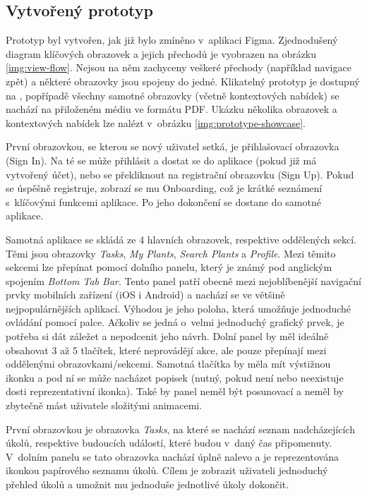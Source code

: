 \documentclass[thesis=M,czech]{FITthesis}[2019/12/23]
\begin{document}
\subsection{Vytvořený prototyp}
Prototyp byl vytvořen, jak již bylo zmíněno v~aplikaci Figma. Zjednodušený diagram klíčových obrazovek a jejich přechodů je vyobrazen na obrázku \ref{img:view-flow}. Nejsou na něm zachyceny veškeré přechody (například navigace zpět) a některé obrazovky jsou spojeny do jedné. Klikatelný prototyp je dostupný na \cite{figma-prototyp}, popřípadě všechny samotné obrazovky (včetně kontextových nabídek) se nachází na přiloženém médiu ve formátu PDF. Ukázku několika obrazovek a kontextových nabídek lze nalézt v~obrázku \ref{img:prototype-showcase}.

První obrazovkou, se kterou se nový uživatel setká, je přihlašovací obrazovka (Sign In). Na té se může přihlásit a dostat se do aplikace (pokud již má vytvořený účet), nebo se překliknout na registrační obrazovku (Sign Up). Pokud se úspěšně registruje, zobrazí se mu Onboarding, což je krátké seznámení s~klíčovými funkcemi aplikace. Po jeho dokončení se dostane do samotné aplikace.

Samotná aplikace se skládá ze 4 hlavních obrazovek, respektive oddělených sekcí. Těmi jsou obrazovky \textit{Tasks}, \textit{My Plants}, \textit{Search Plants} a \textit{Profile}. Mezi těmito sekcemi lze přepínat pomocí dolního panelu, který je známý pod anglickým spojením \textit{Bottom Tab Bar}. Tento panel patří obecně mezi nejoblíbenější navigační prvky mobilních zařízení (iOS i Android) a nachází se ve většině nejpopulárnějších aplikací. Výhodou je jeho poloha, která umožňuje jednoduché ovládání pomocí palce. Ačkoliv se jedná o~velmi jednoduchý grafický prvek, je potřeba si dát záležet a nepodcenit jeho návrh. Dolní panel by měl ideálně obsahovat 3 až 5 tlačítek, které neprovádějí akce, ale pouze přepínají mezi oddělenými obrazovkami/sekcemi. Samotná tlačítka by měla mít výstižnou ikonku a pod ní se může nacházet popisek (nutný, pokud není nebo neexistuje dosti reprezentativní ikonka). Také by panel neměl být posunovací a neměl by zbytečně mást uživatele složitými animacemi. \cite{bottom-tab-bar}

První obrazovkou je obrazovka \textit{Tasks}, na které se nachází seznam nadcházejících úkolů, respektive budoucích událostí, které budou v~daný čas připomenuty. V~dolním panelu se tato obrazovka nachází úplně nalevo a je reprezentována ikonkou papírového seznamu úkolů. Cílem je zobrazit uživateli jednoduchý přehled úkolů a umožnit mu jednoduše jednotlivé úkoly dokončit.
\end{document}
